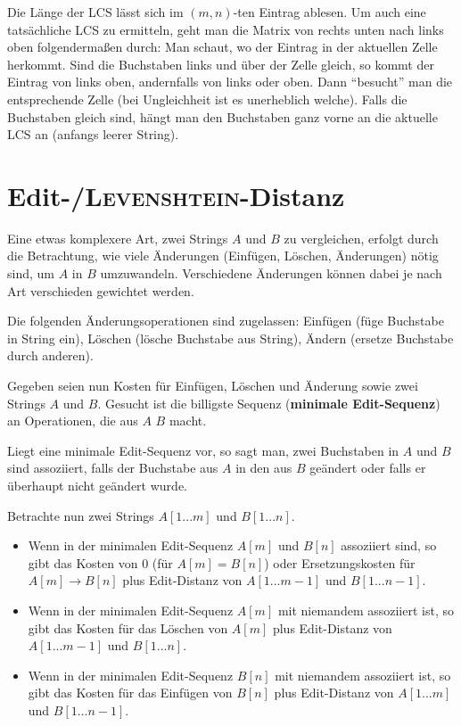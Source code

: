 \linie

Die Länge der LCS lässt sich im $(m, n)$-ten Eintrag ablesen.
Um auch eine tatsächliche LCS zu ermitteln, geht man die Matrix von rechts
unten nach links oben folgendermaßen durch:
Man schaut, wo der Eintrag in der aktuellen Zelle herkommt.
Sind die Buchstaben links und über der Zelle gleich, so kommt der Eintrag
von links oben, andernfalls von links oder oben.
Dann "`besucht"' man die entsprechende Zelle (bei Ungleichheit ist es
unerheblich welche).
Falls die Buchstaben gleich sind, hängt man den Buchstaben ganz vorne
an die aktuelle LCS an (anfangs leerer String).

\section{%
    Edit-/\textsc{Levenshtein}-Distanz%
}

Eine etwas komplexere Art, zwei Strings $A$ und $B$ zu vergleichen, erfolgt
durch die Betrachtung, wie viele Änderungen (Einfügen, Löschen, Änderungen)
nötig sind, um $A$ in $B$ umzuwandeln.
Verschiedene Änderungen können dabei je nach Art verschieden gewichtet werden.

Die folgenden Änderungsoperationen sind zugelassen:
Einfügen (füge Buchstabe in String ein),
Löschen (lösche Buchstabe aus String),
Ändern (ersetze Buchstabe durch anderen).

Gegeben seien nun Kosten für Einfügen, Löschen und Änderung sowie
zwei Strings $A$ und $B$.
Gesucht ist die billigste Sequenz
(\textbf{minimale Edit-Sequenz}) an Operationen, die aus $A$ $B$ macht.

\linie

Liegt eine minimale Edit-Sequenz vor, so sagt man, zwei Buchstaben in $A$
und $B$ sind assoziiert, falls der Buchstabe aus $A$ in den aus $B$ geändert
oder falls er überhaupt nicht geändert wurde.

Betrachte nun zwei Strings $A[1 ... m]$ und $B[1 ... n]$.
\begin{itemize}
    \item
    Wenn in der minimalen Edit-Sequenz $A[m]$ und $B[n]$ assoziiert sind,
    so gibt das Kosten von $0$ (für $A[m] = B[n]$) oder Ersetzungskosten für
    $A[m] \rightarrow B[n]$
    plus Edit-Distanz von $A[1 ... m - 1]$ und $B[1 ... n - 1]$.

    \item
    Wenn in der minimalen Edit-Sequenz $A[m]$ mit niemandem assoziiert ist,
    so gibt das Kosten für das Löschen von $A[m]$
    plus Edit-Distanz von $A[1 ... m - 1]$ und $B[1 ... n]$.

    \item
    Wenn in der minimalen Edit-Sequenz $B[n]$ mit niemandem assoziiert ist,
    so gibt das Kosten für das Einfügen von $B[n]$
    plus Edit-Distanz von $A[1 ... m]$ und $B[1 ... n - 1]$.
\end{itemize}

